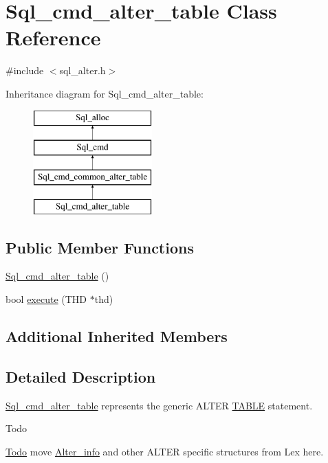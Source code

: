 \hypertarget{classSql__cmd__alter__table}{}\section{Sql\+\_\+cmd\+\_\+alter\+\_\+table Class Reference}
\label{classSql__cmd__alter__table}


{\ttfamily \#include $<$sql\+\_\+alter.\+h$>$}

Inheritance diagram for Sql\+\_\+cmd\+\_\+alter\+\_\+table\+:\begin{figure}[H]
\begin{center}
\leavevmode
\includegraphics[height=4.000000cm]{classSql__cmd__alter__table}
\end{center}
\end{figure}
\subsection*{Public Member Functions}
\begin{DoxyCompactItemize}
\item 
\mbox{\hyperlink{classSql__cmd__alter__table_a9305d595481050226bddf28b1158f826}{Sql\+\_\+cmd\+\_\+alter\+\_\+table}} ()
\item 
bool \mbox{\hyperlink{classSql__cmd__alter__table_af5e5efa7c0d8a3a4c4122c20e86a658f}{execute}} (T\+HD $\ast$thd)
\end{DoxyCompactItemize}
\subsection*{Additional Inherited Members}


\subsection{Detailed Description}
\mbox{\hyperlink{classSql__cmd__alter__table}{Sql\+\_\+cmd\+\_\+alter\+\_\+table}} represents the generic A\+L\+T\+ER \mbox{\hyperlink{structTABLE}{T\+A\+B\+LE}} statement. \begin{DoxyRefDesc}{Todo}
\item[\mbox{\hyperlink{todo__todo000075}{Todo}}]move \mbox{\hyperlink{classAlter__info}{Alter\+\_\+info}} and other A\+L\+T\+ER specific structures from Lex here. \end{DoxyRefDesc}



